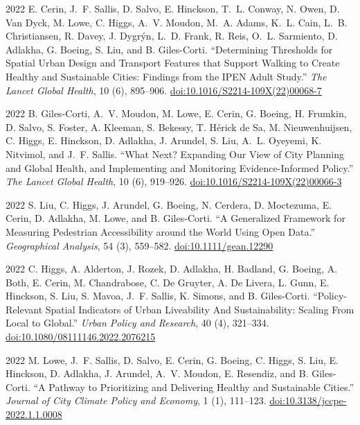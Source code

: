 \documentclass[11pt,letterpaper]{report}
\begin{document}
\begin{tablist}
        \item[2022] \tab{}E. Cerin, J.~F. Sallis, D. Salvo, E. Hinckson, T.~L. Conway, N. Owen, D. Van Dyck, M. Lowe, C. Higgs, A.~V. Moudon, M.~A. Adams, K.~L. Cain, L.~B. Christiansen, R. Davey, J. Dygrýn, L.~D. Frank, R. Reis, O.~L. Sarmiento, D. Adlakha, G. Boeing, S. Liu, and B. Giles-Corti. \enquote{Determining Thresholds for Spatial Urban Design and Transport Features that Support Walking to Create Healthy and Sustainable Cities: Findings from the IPEN Adult Study.}  \textit{The Lancet Global Health}, 10 (6), 895--906. \href{https://doi.org/10.1016/S2214-109X(22)00068-7}{doi:10.1016/S2214-109X(22)00068-7}

        \item[2022] \tab{}B. Giles-Corti, A.~V. Moudon, M. Lowe, E. Cerin, G. Boeing, H. Frumkin, D. Salvo, S. Foster, A. Kleeman, S. Bekessy, T. Hérick de Sa, M. Nieuwenhuijsen, C. Higgs, E. Hinckson, D. Adlakha, J. Arundel, S. Liu, A.~L. Oyeyemi, K. Nitvimol, and J.~F. Sallis. \enquote{What Next? Expanding Our View of City Planning and Global Health, and Implementing and Monitoring Evidence-Informed Policy.}  \textit{The Lancet Global Health}, 10 (6), 919--926. \href{https://doi.org/10.1016/S2214-109X(22)00066-3}{doi:10.1016/S2214-109X(22)00066-3}

        \item[2022] \tab{}S. Liu, C. Higgs, J. Arundel, G. Boeing, N. Cerdera, D. Moctezuma, E. Cerin, D. Adlakha, M. Lowe, and B. Giles-Corti. \enquote{A Generalized Framework for Measuring Pedestrian Accessibility around the World Using Open Data.} \textit{Geographical Analysis}, 54 (3), 559--582. \href{https://doi.org/10.1111/gean.12290}{doi:10.1111/gean.12290}

        \item[2022] \tab{}C. Higgs, A. Alderton, J. Rozek, D. Adlakha, H. Badland, G. Boeing, A. Both, E. Cerin, M. Chandrabose, C. De Gruyter, A. De Livera, L. Gunn, E. Hinckson, S. Liu, S. Mavoa, J.~F. Sallis, K. Simons, and B. Giles-Corti. \enquote{Policy-Relevant Spatial Indicators of Urban Liveability And Sustainability: Scaling From Local to Global.} \textit{Urban Policy and Research}, 40 (4), 321--334. \href{https://doi.org/10.1080/08111146.2022.2076215}{doi:10.1080/08111146.2022.2076215}

        \item[2022] \tab{}M. Lowe, J.~F. Sallis, D. Salvo, E. Cerin, G. Boeing, C. Higgs, S. Liu, E. Hinckson, D. Adlakha, J. Arundel, A.~V. Moudon, E. Resendiz, and B. Giles-Corti. \enquote{A Pathway to Prioritizing and Delivering Healthy and Sustainable Cities.} \textit{Journal of City Climate Policy and Economy}, 1 (1), 111--123. \href{https://doi.org/10.3138/jccpe-2022.1.1.0008}{doi:10.3138/jccpe-2022.1.1.0008}


\end{tablist}
\end{document}
